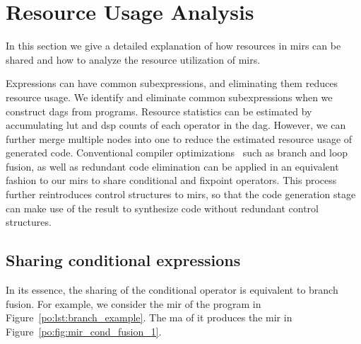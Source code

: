 \section{Resource Usage Analysis}
\label{po:sec:resource}

In this section we give a detailed explanation of how resources in \glspl{mir}
can be shared and how to analyze the resource utilization of \glspl{mir}.

Expressions can have common subexpressions, and eliminating them reduces
resource usage.  We identify and eliminate common subexpressions when we
construct \glspl{dag} from programs.  Resource statistics can be estimated
by accumulating \gls{lut} and \gls{dsp} counts of each operator in the
\gls{dag}\@.  However, we can further merge multiple nodes into one to reduce
the estimated resource usage of generated code.  Conventional compiler
optimizations~\cite{kuck81} such as branch and loop fusion, as well as
redundant code elimination can be applied in an equivalent fashion to our
\glspl{mir} to share conditional and fixpoint operators.  This process further
reintroduces control structures to \glspl{mir}, so that the code generation
stage can make use of the result to synthesize code without redundant control
structures.


\subsection{Sharing conditional expressions}

In its essence, the sharing of the conditional operator is equivalent to
branch fusion.  For example, we consider the \gls{mir} of the program in
Figure~\ref{po:lst:branch_example}.  The \gls{ma} of it produces the \gls{mir}
in Figure~\ref{po:fig:mir_cond_fusion_1}.

